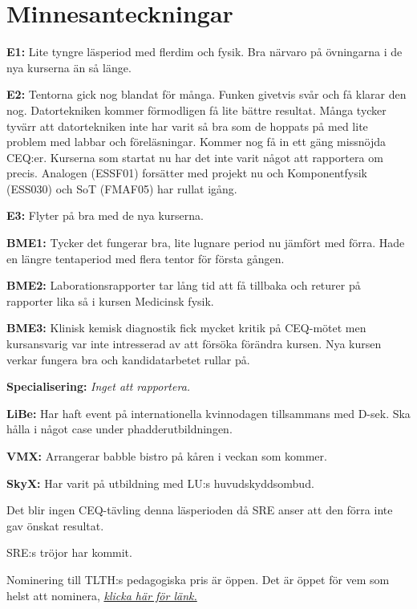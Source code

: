 \documentclass[10pt]{article}
\begin{document}
\section*{Minnesanteckningar}
\begin{paragrafer}
\textbf{E1:} Lite tyngre läsperiod med flerdim och fysik. Bra närvaro på övningarna i de nya kurserna än så länge. 

\textbf{E2:} Tentorna gick nog blandat för många. Funken givetvis svår och få klarar den nog. Datortekniken kommer förmodligen få lite bättre resultat. Många tycker tyvärr att datortekniken inte har varit så bra som de hoppats på med lite problem med labbar och föreläsningar. Kommer nog få in ett gäng missnöjda CEQ:er. Kurserna som startat nu har det inte varit något att rapportera om precis. Analogen (ESSF01) forsätter med projekt nu och Komponentfysik (ESS030) och SoT (FMAF05) har rullat igång.

\textbf{E3:} Flyter på bra med de nya kurserna.  

\textbf{BME1:} Tycker det fungerar bra, lite lugnare period nu jämfört med förra. Hade en längre tentaperiod med flera tentor för första gången. 

\textbf{BME2:} Laborationsrapporter tar lång tid att få tillbaka och returer på rapporter lika så i kursen Medicinsk fysik. 
 
\textbf{BME3:} Klinisk kemisk diagnostik fick mycket kritik på CEQ-mötet men kursansvarig var inte intresserad av att försöka förändra kursen. Nya kursen verkar fungera bra och kandidatarbetet rullar på.
 
\textbf{Specialisering:} \textit{Inget att rapportera.}

\textbf{LiBe:} %
Har haft event på internationella kvinnodagen tillsammans med D-sek. Ska hålla i något case under phadderutbildningen. 

\textbf{VMX:} %
Arrangerar babble bistro på kåren i veckan som kommer. 

\textbf{SkyX:} %
Har varit på utbildning med LU:s huvudskyddsombud.

Det blir ingen CEQ-tävling denna läsperioden då SRE anser att den förra inte gav önskat resultat. 
\newpage
{}
\item SRE:s tröjor har kommit. 
\item Nominering till TLTH:s pedagogiska pris är öppen. Det är öppet för vem som helst att nominera, \textit{\href{https://goo.gl/forms/uNWT6lx2b8KOkuay1}{klicka här för länk.}}


\end{paragrafer}
\end{document}
